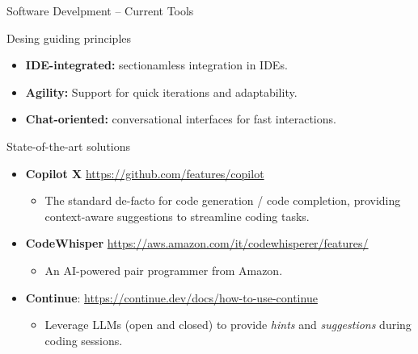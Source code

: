 \documentclass[presentation, 10pt]{beamer}\mode<presentation>{\usetheme{AMSBolognaFC}}
\begin{document}
\begin{frame}{Software Develpment -- Current Tools}
\begin{exampleblock}{Desing guiding principles}
	\begin{itemize}
		\item \textbf{IDE-integrated:} sectionamless integration in IDEs.
		\item \textbf{Agility:} Support for quick iterations and adaptability.
		\item \textbf{Chat-oriented:} conversational interfaces for fast interactions.
	\end{itemize}
\end{exampleblock}
\begin{exampleblock}{State-of-the-art solutions}
	\begin{itemize}
		\item \textbf{Copilot X} \url{https://github.com/features/copilot}
		\begin{itemize}
			\item The standard de-facto for code generation / code completion, providing context-aware suggestions to streamline coding tasks.
		\end{itemize}
		\item \textbf{CodeWhisper} \url{https://aws.amazon.com/it/codewhisperer/features/}
		\begin{itemize}
			\item An AI-powered pair programmer from Amazon.
		\end{itemize}
		\item \textbf{Continue}: \url{https://continue.dev/docs/how-to-use-continue}
		\begin{itemize}
			\item Leverage LLMs (open and closed) to provide \emph{hints} and \emph{suggestions} during coding sessions.
		\end{itemize}
	\end{itemize}
\end{exampleblock}
\end{frame}
\end{document}
